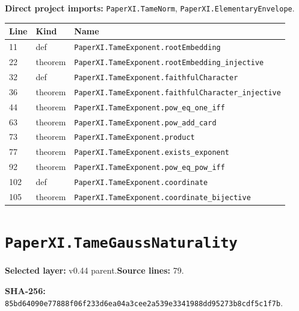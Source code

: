 \documentclass[10pt,oneside]{book}
\begin{document}

\textbf{Direct project imports:} \nolinkurl{PaperXI.TameNorm}, \nolinkurl{PaperXI.ElementaryEnvelope}.

\begin{longtable}{@{}p{}p{}p{}@{}}\toprule Line&Kind&Name\\\midrule\endhead

11&def&\nolinkurl{PaperXI.TameExponent.rootEmbedding}\\

22&theorem&\nolinkurl{PaperXI.TameExponent.rootEmbedding_injective}\\

32&def&\nolinkurl{PaperXI.TameExponent.faithfulCharacter}\\

36&theorem&\nolinkurl{PaperXI.TameExponent.faithfulCharacter_injective}\\

44&theorem&\nolinkurl{PaperXI.TameExponent.pow_eq_one_iff}\\

63&theorem&\nolinkurl{PaperXI.TameExponent.pow_add_card}\\

73&theorem&\nolinkurl{PaperXI.TameExponent.product}\\

77&theorem&\nolinkurl{PaperXI.TameExponent.exists_exponent}\\

92&theorem&\nolinkurl{PaperXI.TameExponent.pow_eq_pow_iff}\\

102&def&\nolinkurl{PaperXI.TameExponent.coordinate}\\

105&theorem&\nolinkurl{PaperXI.TameExponent.coordinate_bijective}\\

\bottomrule\end{longtable}

\section{\texorpdfstring{\nolinkurl{PaperXI.TameGaussNaturality}}{PaperXI.TameGaussNaturality}}\label{module:PaperXI.TameGaussNaturality}

\textbf{Selected layer:} v0.44 parent.\quad\textbf{Source lines:} 79.\par\textbf{SHA-256:} {\scriptsize\nolinkurl{85bd64090e77888f06f233d6ea04a3cee2a539e3341988dd95273b8cdf5c1f7b}}.
\end{document}
